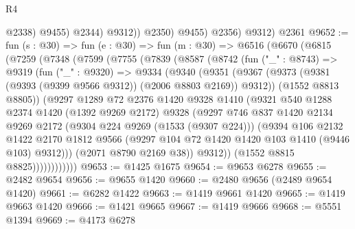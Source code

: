 \begin{lexlean}{R4}
\begin{coremodule}
                      @2338)
                    @9455)
                  @2344)
                @9312))
            @2350)
          @9455)
        @2356)
      @9312)
    @2361
@9652 := fun (s : @30) =>
  fun (e : @30) =>
  fun (m : @30) =>
  @6516
    (@6670
      (@6815
        (@7259
          (@7348
            (@7599
              (@7755
                (@7839
                  (@8587
                    (@8742
                      (fun ("_" : @8743) =>
                      @9319
                        (fun ("_" : @9320) =>
                        @9334
                          (@9340
                            (@9351
                              (@9367
                                (@9373
                                  (@9381 (@9393 (@9399 @9566 @9312)) (@2006 @8803 @2169))
                                  @9312))
                              (@1552 @8813 @8805))
                            (@9297
                              @1289
                              @72
                              @2376
                              @1420
                              @9328
                              @1410
                              (@9321
                                @540
                                @1288
                                @2374
                                @1420
                                (@1392 @9269 @2172)
                                @9328
                                (@9297
                                  @746
                                  @837
                                  @1420
                                  @2134
                                  @9269
                                  @2172
                                  (@9304 @224 @9269 (@1533 (@9307 @224)))
                                  (@9394
                                    @106
                                    @2132
                                    @1422
                                    @2170
                                    @1812
                                    @9566
                                    (@9297 @104 @72 @1420 @1420 @103 @1410 (@9446 @103) @9312)))
                                (@2071 @8790 @2169 @38))
                              @9312))
                          (@1552 @8815 @8825))))))))))))
@9653 := @1425 @1675
@9654 := @9653 @6278
@9655 := @2482 @9654
@9656 := @9655 @1420
@9660 := @2480 @9656 (@2489 @9654 @1420)
@9661 := @6282 @1422
@9663 := @1419 @9661 @1420
@9665 := @1419 @9663 @1420
@9666 := @1421 @9665
@9667 := @1419 @9666
@9668 := @5551 @1394
@9669 := @4173 @6278

\end{coremodule}
\end{lexlean}
